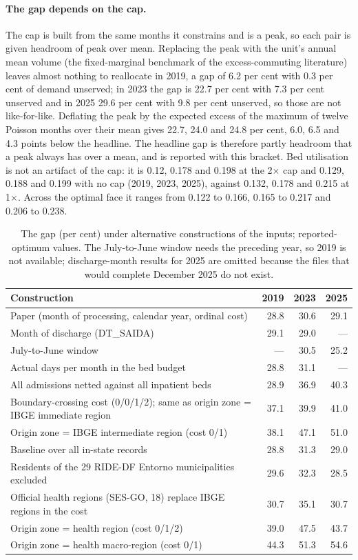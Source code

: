 \paragraph{The gap depends on the cap.} The cap is built from the same months it constrains and is a peak, so each pair is given
headroom of peak over mean. Replacing the peak with the unit's annual mean volume (the fixed-marginal benchmark of the
excess-commuting literature) leaves almost nothing to reallocate in 2019, a gap of 6.2 per cent with 0.3 per cent of demand unserved; in 2023 the gap is
22.7 per cent with 7.3 per cent unserved and in 2025 29.6 per cent with 9.8 per cent unserved, so those are not like-for-like. Deflating the peak by
the expected excess of the maximum of twelve Poisson months over their mean gives 22.7, 24.0 and 24.8 per cent, 6.0, 6.5 and 4.3 points below the
headline. The headline gap is therefore partly headroom that a peak always has over a mean, and is reported with this bracket.
Bed utilisation is not an artifact of the cap: it is 0.12, 0.178 and 0.198 at the 2$\times$ cap and 0.129, 0.188 and 0.199 with no cap (2019, 2023,
2025), against 0.132, 0.178 and 0.215 at 1$\times$. Across the optimal face it ranges from 0.122 to 0.166, 0.165 to 0.217 and 0.206 to 0.238.


\begin{table}[t]
\centering
\caption{The gap (per cent) under alternative constructions of the inputs; reported-optimum values. The July-to-June window needs the
preceding year, so 2019 is not available; discharge-month results for 2025 are omitted because the files that would complete December
2025 do not exist.}
\label{tab:measure}
\small
\begin{tabular}{p{}rrr}
\toprule
Construction & 2019 & 2023 & 2025 \\
\midrule
Paper (month of processing, calendar year, ordinal cost) & 28.8 & 30.6 & 29.1 \\
Month of discharge (DT\_SAIDA) & 29.1 & 29.0 & --- \\
July-to-June window & --- & 30.5 & 25.2 \\
Actual days per month in the bed budget & 28.8 & 31.1 & --- \\
All admissions netted against all inpatient beds & 28.9 & 36.9 & 40.3 \\
Boundary-crossing cost (0/0/1/2); same as origin zone = IBGE immediate region & 37.1 & 39.9 & 41.0 \\
Origin zone = IBGE intermediate region (cost 0/1) & 38.1 & 47.1 & 51.0 \\
Baseline over all in-state records & 28.8 & 31.3 & 29.0 \\
Residents of the 29 RIDE-DF Entorno municipalities excluded & 29.6 & 32.3 & 28.5 \\
Official health regions (SES-GO, 18) replace IBGE regions in the cost & 30.7 & 35.1 & 30.7 \\
Origin zone = health region (cost 0/1/2) & 39.0 & 47.5 & 43.7 \\
Origin zone = health macro-region (cost 0/1) & 44.3 & 51.3 & 54.6 \\
\bottomrule
\end{tabular}
\end{table}

